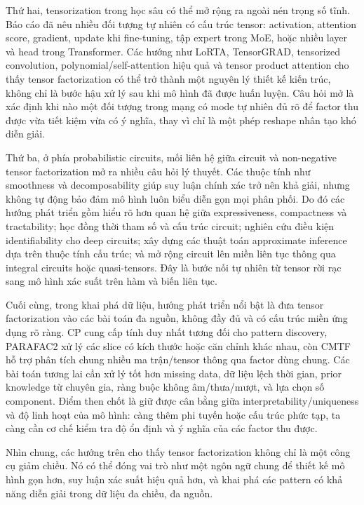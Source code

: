 Thứ hai, tensorization trong học sâu có thể mở rộng ra ngoài nén trọng số tĩnh.
Báo cáo đã nêu nhiều đối tượng tự nhiên có cấu trúc tensor: activation, attention
score, gradient, update khi fine-tuning, tập expert trong MoE, hoặc nhiều layer và
head trong Transformer. Các hướng như LoRTA, TensorGRAD, tensorized convolution,
polynomial/self-attention hiệu quả và tensor product attention cho thấy tensor
factorization có thể trở thành một nguyên lý thiết kế kiến trúc, không chỉ là
bước hậu xử lý sau khi mô hình đã được huấn luyện. Câu hỏi mở là xác định khi nào
một đối tượng trong mạng có mode tự nhiên đủ rõ để factor thu được vừa tiết kiệm
vừa có ý nghĩa, thay vì chỉ là một phép reshape nhân tạo khó diễn giải.

Thứ ba, ở phía probabilistic circuits, mối liên hệ giữa circuit và non-negative
tensor factorization mở ra nhiều câu hỏi lý thuyết. Các thuộc tính như
smoothness và decomposability giúp suy luận chính xác trở nên khả giải, nhưng
không tự động bảo đảm mô hình luôn biểu diễn gọn mọi phân phối. Do đó các hướng
phát triển gồm hiểu rõ hơn quan hệ giữa expressiveness, compactness và
tractability; học đồng thời tham số và cấu trúc circuit; nghiên cứu điều kiện
identifiability cho deep circuits; xây dựng các thuật toán approximate inference
dựa trên thuộc tính cấu trúc; và mở rộng circuit lên miền liên tục thông qua
integral circuits hoặc quasi-tensors. Đây là bước nối tự nhiên từ tensor rời rạc
sang mô hình xác suất trên hàm và biến liên tục.

Cuối cùng, trong khai phá dữ liệu, hướng phát triển nổi bật là đưa tensor
factorization vào các bài toán đa nguồn, không đầy đủ và có cấu trúc miền ứng
dụng rõ ràng. CP cung cấp tính duy nhất tương đối cho pattern discovery,
PARAFAC2 xử lý các slice có kích thước hoặc căn chỉnh khác nhau, còn CMTF hỗ trợ
phân tích chung nhiều ma trận/tensor thông qua factor dùng chung. Các bài toán
tương lai cần xử lý tốt hơn missing data, dữ liệu lệch thời gian, prior knowledge
từ chuyên gia, ràng buộc không âm/thưa/mượt, và lựa chọn số component. Điểm then
chốt là giữ được cân bằng giữa interpretability/uniqueness và độ linh hoạt của
mô hình: càng thêm phi tuyến hoặc cấu trúc phức tạp, ta càng cần cơ chế kiểm tra
độ ổn định và ý nghĩa của các factor thu được.

Nhìn chung, các hướng trên cho thấy tensor factorization không chỉ là một công
cụ giảm chiều. Nó có thể đóng vai trò như một ngôn ngữ chung để thiết kế mô hình
gọn hơn, suy luận xác suất hiệu quả hơn, và khai phá các pattern có khả năng
diễn giải trong dữ liệu đa chiều, đa nguồn.

